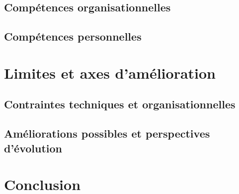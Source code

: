 \subsection{Compétences organisationnelles}

\subsection{Compétences personnelles}

\section{Limites et axes d’amélioration}
\subsection{Contraintes techniques et organisationnelles}

\subsection{Améliorations possibles et perspectives d’évolution}

\section{Conclusion}
\clearpage